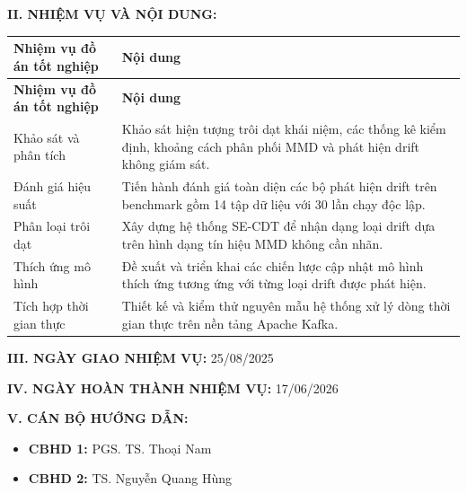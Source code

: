 \vspace{2mm}

\begin{flushleft}

\noindent \textbf{II. \hspace{1mm} NHIỆM VỤ VÀ NỘI DUNG:}

\end{flushleft}

\vspace{1mm}

\begin{longtable}{@{}p{4cm}p{\dimexpr\linewidth-4cm-4\tabcolsep\relax}@{}}
\textbf{Nhiệm vụ đồ án tốt nghiệp} & \textbf{Nội dung} \\
\endfirsthead
\textbf{Nhiệm vụ đồ án tốt nghiệp} & \textbf{Nội dung} \\
\endhead
Khảo sát và phân tích & Khảo sát hiện tượng trôi dạt khái niệm, các thống kê kiểm định, khoảng cách phân phối MMD và phát hiện drift không giám sát. \\
Đánh giá hiệu suất & Tiến hành đánh giá toàn diện các bộ phát hiện drift trên benchmark gồm 14 tập dữ liệu với 30 lần chạy độc lập. \\
\pagebreak
Phân loại trôi dạt & Xây dựng hệ thống SE-CDT để nhận dạng loại drift dựa trên hình dạng tín hiệu MMD không cần nhãn. \\
Thích ứng mô hình & Đề xuất và triển khai các chiến lược cập nhật mô hình thích ứng tương ứng với từng loại drift được phát hiện. \\
Tích hợp thời gian thực & Thiết kế và kiểm thử nguyên mẫu hệ thống xử lý dòng thời gian thực trên nền tảng Apache Kafka. \\
\end{longtable}

\begin{flushleft}
\noindent \textbf{III. \hspace{1mm} NGÀY GIAO NHIỆM VỤ:} 25/08/2025
\end{flushleft}

\vspace{2mm}

\begin{flushleft}
\noindent \textbf{IV. \hspace{1mm} NGÀY HOÀN THÀNH NHIỆM VỤ:} 17/06/2026
\end{flushleft}

\vspace{2mm}

\begin{flushleft}
\noindent \textbf{V. \hspace{1mm} CÁN BỘ HƯỚNG DẪN:}
\begin{itemize}
    \item \textbf{CBHD 1:} PGS. TS. Thoại Nam
    \item \textbf{CBHD 2:} TS. Nguyễn Quang Hùng
\end{itemize}
\end{flushleft}

